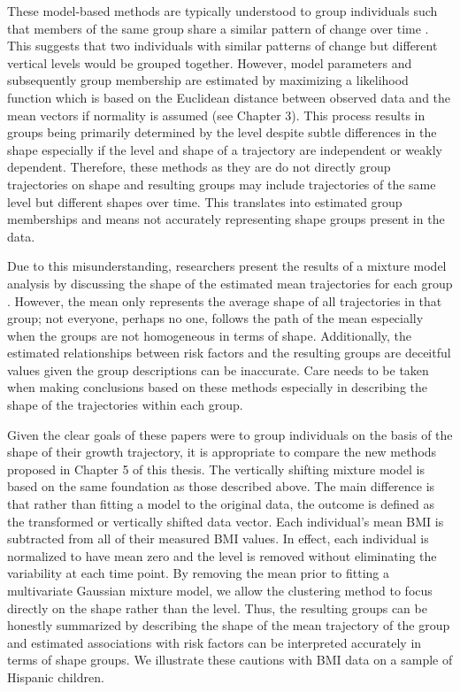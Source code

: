 These model-based methods are typically understood to group individuals such that members of the same group share a similar pattern of change over time \cite{garden2012}. This suggests that two individuals with similar patterns of change but different vertical levels would be grouped together. However, model parameters and subsequently group membership are estimated by maximizing a likelihood function which is based on the Euclidean distance between observed data and the mean vectors if normality is assumed (see Chapter 3). This process results in groups being primarily determined by the level despite subtle differences in the shape especially if the level and shape of a trajectory are independent or weakly dependent. Therefore, these methods as they are do not directly group trajectories on shape and resulting groups may include trajectories of the same level but different shapes over time. This translates into estimated group memberships and means not accurately representing shape groups present in the data.

Due to this misunderstanding, researchers present the results of a mixture model analysis by discussing the shape of the estimated mean trajectories for each group \cite{pryor2011,carter2012}. However, the mean only represents the average shape of all trajectories in that group; not everyone, perhaps no one, follows the path of the mean especially when the groups are not homogeneous in terms of shape. Additionally, the estimated relationships between risk factors and the resulting groups are deceitful values given the group descriptions can be inaccurate. Care needs to be taken when making conclusions based on these methods especially in describing the shape of the trajectories within each group.  

Given the clear goals of these papers were to group individuals on the basis of the shape of their growth trajectory, it is appropriate to compare the new methods proposed in Chapter 5 of this thesis. The vertically shifting mixture model is based on the same foundation as those described above. The main difference is that rather than fitting a model to the original data, the outcome is defined as the transformed or vertically shifted data vector. Each individual's mean BMI is subtracted from all of their measured BMI values. In effect, each individual is normalized to have mean zero and the level is removed without eliminating the variability at each time point. By removing the mean prior to fitting a multivariate Gaussian mixture model, we allow the clustering method to focus directly on the shape rather than the level. Thus, the resulting groups can be honestly summarized by describing the shape of the mean trajectory of the group and estimated associations with risk factors can be interpreted accurately in terms of shape groups. We illustrate these cautions with BMI data on a sample of Hispanic children.


